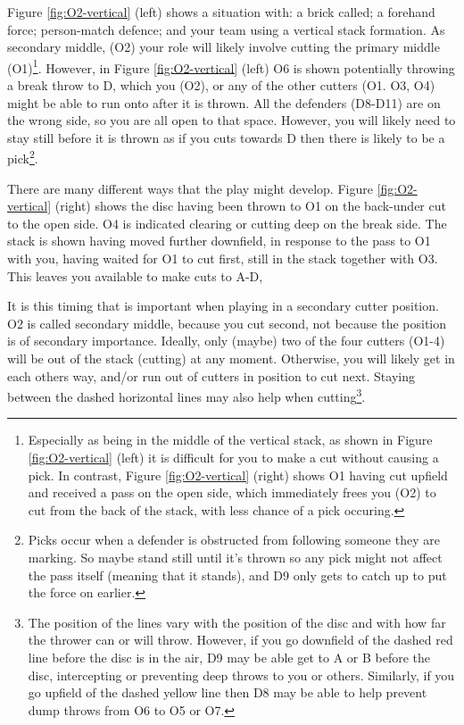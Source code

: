 \documentclass{tufte-handout}
\begin{document}
Figure \ref{fig:O2-vertical} (left) shows 
a situation 
with: 
a brick called;
a forehand force; 
person-match defence; 
and your team using 
a vertical stack formation.
As secondary middle, 
(O2) 
your role 
will likely 
involve cutting 
the primary middle 
(O1)\footnote{
Especially as being 
in the middle of the vertical stack,
as shown in 
Figure \ref{fig:O2-vertical} (left)
it is difficult for 
you to make a cut 
without causing 
a pick. 
In contrast, 
Figure \ref{fig:O2-vertical} (right)
shows O1 
having cut upfield 
and received 
a pass 
on the open side, 
which immediately 
frees you 
(O2) 
to cut 
from the back of the stack,
with less chance 
of a pick occuring.}.
However, 
in Figure \ref{fig:O2-vertical} (left)
O6 is shown
potentially throwing 
a break throw to D,
which you 
(O2),
or any of the other cutters
(O1. O3, O4) 
might be able to run onto 
after it is thrown. 
All the defenders 
(D8-D11) 
are on the wrong side, 
so you are all open 
to that space.
However,
you will likely need to 
stay still before it is thrown 
as if you 
cuts towards D 
then there is likely 
to be a pick\footnote{
Picks occur
when a  
defender is 
obstructed from 
following someone 
they are marking.  
So maybe stand still
until it's thrown 
so any pick 
might not affect the pass itself
(meaning that it stands), 
and D9 
only gets to catch up 
to put the force on earlier.}.

There are many 
different ways that the 
play might develop.
Figure \ref{fig:O2-vertical} (right) shows 
the disc having been thrown 
to O1
on the back-under 
cut 
to the open side. 
O4 is indicated 
clearing 
or cutting 
deep on 
the break side. 
The stack is shown having 
moved further downfield, 
in response to the pass
to O1
with you, 
having waited
for O1 to cut first,
still in the stack
together with
O3. 
This leaves 
you 
available to make 
cuts
to A-D, 


It is this timing 
that is important 
when playing 
in a secondary cutter position. 
O2 is called secondary middle, 
because you cut second, 
not because the position is of secondary importance. 
Ideally,
only  
(maybe) two of the four cutters
(O1-4) 
will be out of the stack (cutting)
at any moment.
Otherwise, 
you will likely 
get in each others way, 
and/or run out of cutters 
in position 
to cut next.  
Staying  
between 
the dashed 
horizontal 
lines 
may also help when cutting\footnote{ 
The position of 
the lines vary
with the position of the disc
and with how far the thrower  
can or will 
throw. 
However, 
if you go 
downfield of the dashed red line 
before the disc is in the air,
D9 may be able 
get to
A or B 
before the disc,
intercepting 
or preventing 
deep throws to 
you or others. 
Similarly, 
if you go 
upfield of the dashed yellow line
then D8 may 
be able to help
prevent dump throws from O6
to O5 
or O7.}.
\end{document}

